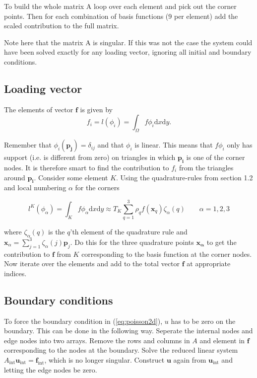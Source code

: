 \documentclass[paper=a4, fontsize=11pt]{scrartcl} %
\begin{document}
To build the whole matrix A loop over each element and pick out the corner points. Then for each combination of basis functions (9 per element) add the scaled contribution to the full matrix.

Note here that the matrix A is singular. If this was not the case the system could have been solved exactly for any loading vector, ignoring all initial and boundary conditions.

\subsection{Loading vector}
The elements of vector $\mathbf{f}$ is given by
\[ f_i = l(\phi_i) = \int_{\Omega}f\phi_i\mathrm{d}x\mathrm{d}y.\]

Remember that $\phi_i(\mathbf{p_j})=\delta_{ij}$ and that $\phi_i$ is linear. This means that $f\phi_i$ only has support (i.e. is different from zero) on triangles in which $\mathbf{p_i}$ is one of the corner nodes. It is therefore smart to find the contribution to $f_i$ from the triangles around $\mathbf{p_i}$. Consider some element $K$. Using the quadrature-rules from section 1.2 and local numbering $\alpha$ for the corners 

\[ l^{K}(\phi_\alpha) = \int_{K}f\phi_\alpha\mathrm{d}x\mathrm{d}y \approx T_K \sum\limits^{3}_{q=1} \rho_q f(\mathbf{x}_q)\zeta_\alpha(q) \qquad \alpha =1,2,3\]

where $\zeta_\alpha(q)$ is the $q$'th element of the quadrature rule and $\mathbf{x}_\alpha=\sum^3_{j=1}\zeta_\alpha(j)\mathbf{p}_j$. Do this for the three quadrature points $\mathbf{x_\alpha}$ to get the contribution to $\mathbf{f}$ from $K$ corresponding to the basis function at the corner nodes. Now iterate over the elements and add to the total vector $\mathbf{f}$ at appropriate indices.
\subsection{Boundary conditions}
To force the boundary condition in (\ref{eq:poisson2d}), $u$ has to be zero on the boundary. This can be done in the following way. Seperate the internal nodes and edge nodes into two arrays. Remove the rows and columns in $A$ and element in $\mathbf{f}$ corresponding to the nodes at the boundary. Solve the reduced linear system $A_\mathrm{int}\mathbf{u}_\mathrm{int}=\mathbf{f}_\mathrm{int}$, which is no longer singular. Construct $\mathbf{u}$ again from $\mathbf{u}_\mathrm{int}$ and letting the edge nodes be zero.  
\end{document}
